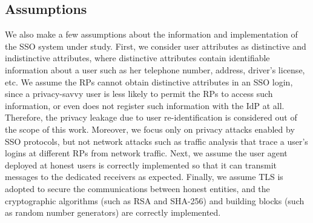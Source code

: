 \subsection{Assumptions}
We also make a few assumptions about the information and implementation of the SSO system under study. First, we consider user attributes as distinctive and indistinctive attributes, where distinctive attributes contain identifiable information about a user such as her telephone number, address, driver's license, etc. We assume the RPs cannot obtain distinctive attributes in an SSO login, since a privacy-savvy user is less likely to permit the RPs to access such information, or even does not register such information with the IdP at all. Therefore, the privacy leakage due to user re-identification is considered out of the scope of this work. Moreover, we focus only on privacy attacks enabled by SSO protocols, but not network attacks such as traffic analysis that trace a user's logins at different RPs from network traffic. Next, we assume the user agent deployed at honest users is correctly implemented so that it can transmit messages to the dedicated receivers as expected. Finally, we assume TLS is adopted to secure the communications between honest entities, and the cryptographic algorithms (such as RSA and SHA-256) and building blocks (such as random number generators) are correctly implemented.






